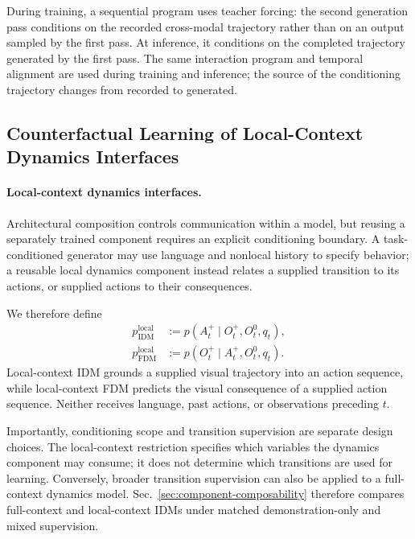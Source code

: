 During training, a sequential program uses teacher forcing: the second
generation pass conditions on the recorded cross-modal trajectory rather than
on an output sampled by the first pass. At inference, it conditions on the
completed trajectory generated by the first pass. The same interaction program
and temporal alignment are used during training and inference; the source of the conditioning trajectory changes
from recorded to generated. 

\subsection{Counterfactual Learning of Local-Context Dynamics Interfaces}
\label{sec:strict-dynamics}

\paragraph{Local-context dynamics interfaces.}
Architectural composition controls communication within a model, but
reusing a separately trained component requires an explicit conditioning
boundary. A task-conditioned generator may use language and nonlocal
history to specify behavior; a reusable local dynamics component instead
relates a supplied transition to its actions, or supplied actions to their
consequences.

We therefore define
\begin{equation}
\begin{aligned}
p_{\mathrm{IDM}}^{\mathrm{local}}
&:=
p(
 A_t^+
\mid
 O_t^+, O_t^0,q_t
),\\
p_{\mathrm{FDM}}^{\mathrm{local}}
&:=
p(
 O_t^+
\mid
 A_t^+, O_t^0,q_t
).
\end{aligned}
\label{eq:strict-modeling-roles}
\end{equation}
Local-context IDM grounds a supplied visual trajectory into an action sequence,
while local-context FDM predicts the visual consequence of a supplied action
sequence. Neither receives language, past actions, or observations
preceding $t$.

Importantly, conditioning scope and transition supervision are separate
design choices. The local-context restriction specifies which variables the dynamics component
may consume; it does not determine which transitions are used for learning.
Conversely, broader transition supervision can also be applied to a
full-context dynamics model. Sec.~\ref{sec:component-composability}
therefore compares full-context and local-context IDMs under matched
demonstration-only and mixed supervision.

